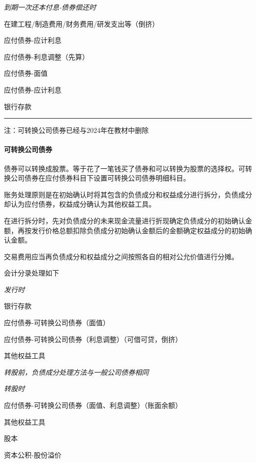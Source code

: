 \documentclass[UTF8,12pt]{ctexart}
\newenvironment{Dr}{%
	\begin{list}{}%
		{
			\setlength{\leftmargin}{2em}
			\setlength{\labelwidth}{2em}
			\setlength{\labelsep}{0pt}
			\setlength{\itemindent}{0pt}
			\setlength{\listparindent}{0pt}
			\setlength{\parsep}{0pt}
			\setlength{\topsep}{0pt}
		}
		\item[\textbf{借：}]
	}{%
	\end{list}
}
\newenvironment{Cr}{%
	\begin{list}{}%
		{
			\setlength{\leftmargin}{3em}
			\setlength{\labelwidth}{2em}
			\setlength{\labelsep}{0pt}
			\setlength{\itemindent}{0pt}
			\setlength{\listparindent}{0pt}
			\setlength{\parsep}{0pt}
			\setlength{\topsep}{0pt}
		}
		\item[\textbf{贷：}]
	}{%
	\end{list}
}
\numberwithin{equation}{section} %
\numberwithin{figure}{section}
\numberwithin{table}{section}
\begin{document}
	\textit{到期一次还本付息-债券偿还时}
	
	\begin{Dr}
		在建工程/制造费用/财务费用/研发支出等（倒挤）
	\end{Dr}
	\begin{Cr}
		应付债券-应计利息
		
		应付债券-利息调整（先算）
	\end{Cr}
	
	\begin{Dr}
		应付债券-面值
		
		应付债券-应计利息
	\end{Dr}
	\begin{Cr}
		银行存款
	\end{Cr}

	
	\vspace{5pt}
	\hrule
	\vspace{5pt}
	注：可转换公司债券已经与2024年在教材中删除

	\paragraph{可转换公司债券}
	债券可以转换成股票。等于花了一笔钱买了债券和可以转换为股票的选择权。可转换公司债券在应付债券科目下设置可转换公司债券明细科目。
	
	账务处理原则是在初始确认时将其包含的负债成分和权益成分进行拆分，负债成分却认为应付债券，权益成分确认为其他权益工具。
	
	在进行拆分时，先对负债成分的未来现金流量进行折现确定负债成分的初始确认金额，再按发行价格总额扣除负债成分初始确认金额后的金额确定权益成分的初始确认金额。
	
	交易费用应当再负债成分和权益成分之间按照各自的相对公允价值进行分摊。
	
	会计分录处理如下
	
	\textit{发行时}
	
	\begin{Dr}
		银行存款
	\end{Dr}
	\begin{Cr}
		应付债券-可转换公司债券（面值）
		
		应付债券-可转换公司债券（利息调整）（可借可贷，倒挤）
		
		其他权益工具
	\end{Cr}

	\textit{转股前，负债成分处理方法与一般公司债券相同}
	
	\textit{转股时}
	
	\begin{Dr}
		应付债券-可转换公司债券（面值、利息调整）（账面余额）
		
		其他权益工具
	\end{Dr}
	\begin{Cr}
		股本
		
		资本公积-股份溢价
	\end{Cr}
\end{document}
